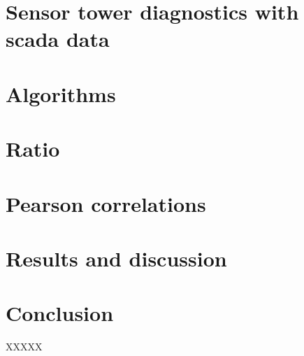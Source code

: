 \documentclass[journal]{IEEEtran}
\begin{document}
\section{Sensor tower diagnostics with scada data}

\section{Algorithms}
\section{Ratio}
\section{Pearson correlations}
\section{Results and discussion}
\section{Conclusion}
XXXXX



\end{document}
